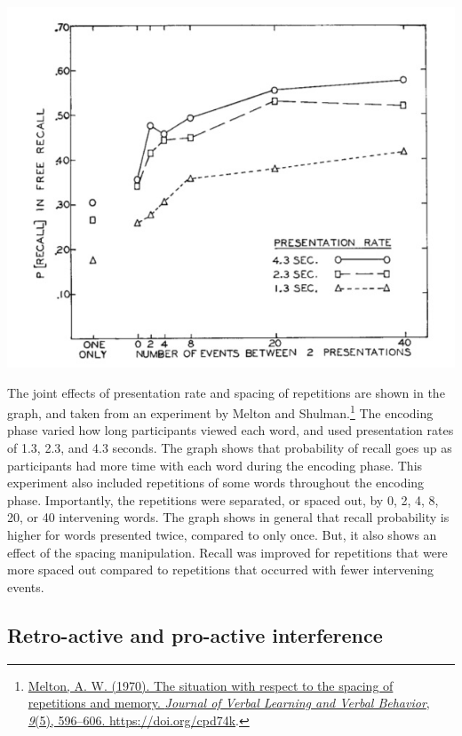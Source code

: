 \documentclass[
  oneside,
  12pt]{crumpbook}
\newenvironment{floatright50}{%
  \wrapfigure{R}{.5\textwidth}%
  }{%
  \endwrapfigure}
\begin{document}
\begin{floatright50}
\includegraphics[width=1\linewidth]{imgs/Melton_1970}

\end{floatright50}

The joint effects of presentation rate and spacing of repetitions are shown in the graph, and taken from an experiment by Melton and Shulman.\footnote{\protect\hyperlink{ref-meltonSituationRespectSpacing1970}{Melton, A. W. (1970). The situation with respect to the spacing of repetitions and memory. \emph{Journal of Verbal Learning and Verbal Behavior}, \emph{9}(5), 596--606. \url{https://doi.org/cpd74k}}.} The encoding phase varied how long participants viewed each word, and used presentation rates of 1.3, 2.3, and 4.3 seconds. The graph shows that probability of recall goes up as participants had more time with each word during the encoding phase. This experiment also included repetitions of some words throughout the encoding phase. Importantly, the repetitions were separated, or spaced out, by 0, 2, 4, 8, 20, or 40 intervening words. The graph shows in general that recall probability is higher for words presented twice, compared to only once. But, it also shows an effect of the spacing manipulation. Recall was improved for repetitions that were more spaced out compared to repetitions that occurred with fewer intervening events.

\hypertarget{retro-active-and-pro-active-interference}{%
\subsection{Retro-active and pro-active interference}\label{retro-active-and-pro-active-interference}}
\end{document}
